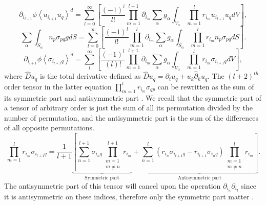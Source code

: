 {\begin{equation}
    \label{eq:dt}
\end{equation}
\begin{equation}
    \partial_{i_{l+1}} \phi \left< u_{{i_{l+1}}} u_q\right>^d
    = \sum_{l=0}^\infty  \left[\frac{(-1)^l}{l!} \prod^{l+1}_{m=1}\partial_{i_m}\sum_\alpha  g_\alpha \int_{V_\alpha} \prod^l_{m=1}r_{i_m} u_{i_{l+1}} u_q dV\right],
    \label{eq:u_pu_q1}
\end{equation}
\begin{equation}
    \sum_\alpha\int_{S_\alpha}n_p\sigma_{pq} g dS
    = \sum_{l=0}^\infty  \left[\frac{(-1)^l}{l!} \prod^l_{m=1}\partial_{i_m} \sum_\alpha g_\alpha\int_{S_\alpha} \prod^l_{m=1}r_{i_m} n_p\sigma_{pq} dS\right].
    \label{eq:C4}
\end{equation}
\begin{equation}
    \partial_{i_{l+1}}
    \phi\left<\sigma_{i_{l+1}q}\right>^d=
    \sum_l^\infty
    \left[
        \frac{(-1)^{l}}{(l)!}
        \prod^{l+1}_{m=1}
        \partial_{i_m}
        \sum_{\alpha}
        g_{\alpha}
        \int_{V_\alpha}
        \prod^{l}_{m=1}
        r_{i_m} \sigma_{i_{l+1} q}dV
    \right],
    \label{eq:expsig}
\end{equation}
where $\hat{D} u_q$ is the total derivative defined as $\hat{D} u_q = \partial_t u_q + u_k \hat{\partial}_k u_q$.
The $(l+2)^{th}$ order tensor in the latter equation $\prod^{l}_{m=1} r_{i_m} \sigma_{qp}$ can be rewritten as the sum of its symmetric part and antisymmetric part \citep{nott2011suspension}.
We recall that the symmetric part of a tensor of arbitrary order is just the sum of all its permutation divided by the number of permutation, and the antisymmetric part is the sum of the differences of all opposite permutations.
\begin{equation}
    \prod^{l}_{m=1} r_{i_m} \sigma_{i_{l+1}q}
    = \frac{1}{l+1}
    \underbrace{\left[\sum_{n=1}^{l+1} \sigma_{i_{n}q}\prod^{l+1}_{\substack{m=1 \\ m \neq n}} r_{i_m} \right.}_{\text{Symmetric part}}
    +\underbrace{\left.\sum_{n=1}^{l} (r_{i_n}\sigma_{i_{l+1}q} - r_{i_{l+1}}\sigma_{i_{n}q}) \prod^{l}_{\substack{m=1 \\ m \neq n}} r_{i_m} \right]}_{\text{Antisymmetric part}}.
    \label{eq:symanisym}
\end{equation}
The antisymmetric part of this tensor will cancel upon the operation $\partial_{i_n}\partial_{i_l}$ since it is antisymmetric on these indices, therefore only the symmetric part matter \citep{nott2011suspension}.
}

